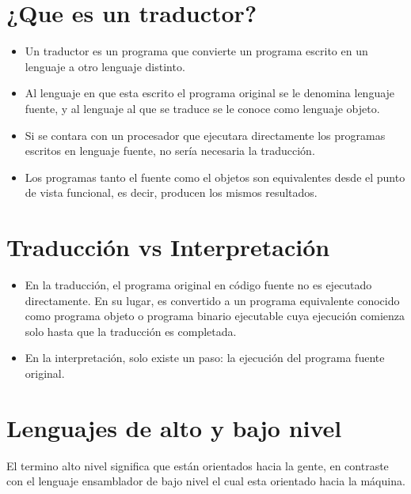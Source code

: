 \documentclass[11pt]{article}
\begin{document}
\section{¿Que es un traductor?}
\label{sec:orga802d67}
\begin{itemize}
\item Un traductor es un programa que convierte un programa escrito en un lenguaje a otro lenguaje distinto.

\item Al lenguaje en que esta escrito el programa original se le denomina lenguaje fuente, y al lenguaje al que se traduce se le conoce como lenguaje objeto.

\item Si se contara con un procesador que ejecutara directamente los programas escritos en lenguaje fuente, no sería necesaria la traducción.

\item Los programas tanto el fuente como el objetos son equivalentes desde el punto de vista funcional, es decir, producen los mismos resultados.
\end{itemize}

\section{Traducción vs Interpretación}
\label{sec:org5f3bc04}
\begin{itemize}
\item En la traducción, el programa original en código fuente no es ejecutado directamente. En su lugar, es convertido a un programa equivalente conocido como programa objeto o programa binario ejecutable cuya ejecución comienza solo hasta que la traducción es completada.

\item En la interpretación, solo existe un paso: la ejecución del programa fuente original.
\end{itemize}

\section{Lenguajes de alto y bajo nivel}
\label{sec:orgaf7fd2d}
El termino alto nivel significa que están orientados hacia la gente, en contraste con el lenguaje ensamblador de bajo nivel el cual esta orientado hacia la máquina.
\end{document}
